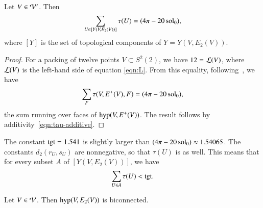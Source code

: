 \documentclass{llncs}
\def\op#1{{\hbox{#1}}}
\begin{document}
\begin{lemma}\label{lemma:uce} 
Let $V\in {\mathcal V}'$.  Then
\[
\sum_{U\in [Y(V,E_2(V))]} \tau(U) = (4\pi - 20\operatorname{sol}_0),
\]
where $[Y]$ is the set of topological components of $Y=Y(V,E_2(V))$.
\end{lemma}

%
\begin{proof} For a packing of twelve points $V\subset S^2(2)$, we have
$12={\mathcal L}(V)$, where ${\mathcal L}(V)$ is the left-hand side of equation \eqref{eqn:L}.   
From this equality, following~\cite[8.2.3]{DSP}, we have
\[
  \sum_F \tau (V,E^+(V),F) = (4\pi - 20\operatorname{sol}_0),
\]
the sum running over faces of $\op{hyp}(V,E^+(V))$.
The result follows by additivity~\eqref{eqn:tau-additive}.
\end{proof}

The constant $\op{tgt}=1.541$ is slightly
larger than $(4\pi-20\operatorname{sol}_0)\approx 1.54065$.  The constants $d_2(r_U,s_U)$ are nonnegative, so that
$\tau(U)$ is as well.  This means that for every subset
$A$ of $[Y(V,E_2(V))]$, we have
\begin{equation}\label{eqn:subtgt}
\sum_{U\in A} \tau(U) < \op{tgt}.
\end{equation}



\begin{lemma}[biconnected]\label{lemma:biconnected}
  Let $V\in {\mathcal V}$.  Then $\op{hyp}(V,E_2(V))$ is biconnected.
\end{lemma}
\end{document}
